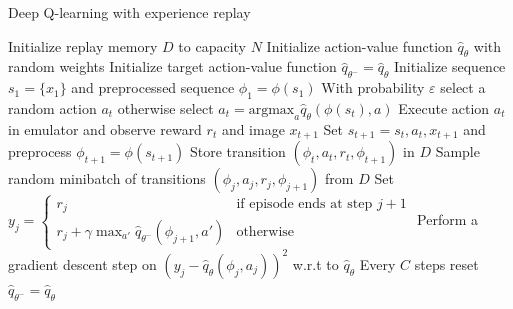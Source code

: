 \begin{algorithm}
	\caption{Deep Q-learning with experience replay}\label{algorithm:dqn}
	\begin{algorithmic}
	\State Initialize replay memory $D$ to capacity $N$
	\State Initialize action-value function $\hat{q}_\theta$ with random weights
	\State Initialize target action-value function $\hat{q}_{\theta^-} = \hat{q}_\theta$
		\State Initialize sequence $s_1 = \{x_1\}$ and preprocessed sequence $\phi_1 = \phi(s_1)$
			\State With probability $\varepsilon$ select a random action $a_t$
			\State otherwise select $a_t = \text{argmax}_a \hat{q}_\theta(\phi(s_t), a)$
			\State Execute action $a_t$ in emulator and observe reward $r_t$ and image $x_{t+1}$
			\State Set $s_{t+1} = s_t, a_t, x_{t+1}$ and preprocess $\phi_{t+1} = \phi(s_{t+1})$
			\State Store transition $(\phi_t, a_t, r_t, \phi_{t+1})$ in $D$
			\State Sample random minibatch of transitions $(\phi_j, a_j, r_j, \phi_{j+1})$ from $D$
			\State Set $ y_j = \begin{cases} r_j & \mbox{if episode ends at step } j+1 \\ r_j + \gamma \max_{a'}\hat{q}_{\theta^-}(\phi_{j+1}, a') & \mbox{otherwise} \end{cases}$
			\State Perform a gradient descent step on $(y_j - \hat{q}_\theta(\phi_j, a_j))^2$ w.r.t to $\hat{q}_\theta$
			\State Every $C$ steps reset $\hat{q}_{\theta^-} = \hat{q}_{\theta}$
		\EndFor
	\EndFor
\end{algorithmic}
\end{algorithm}

